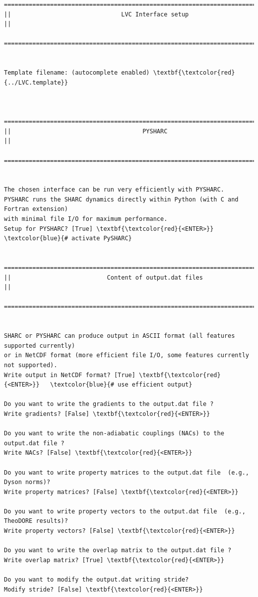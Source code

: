 \documentclass[a4paper,11pt,DIV=15,openany]{scrbook}
\begin{document}
\begin{oframed}
\begin{Verbatim}[commandchars=\\\{\}]
  ================================================================================
||                               LVC Interface setup                              ||
  ================================================================================


Template filename: (autocomplete enabled) \textbf{\textcolor{red}{../LVC.template}}


  ================================================================================
||                                     PYSHARC                                    ||
  ================================================================================


The chosen interface can be run very efficiently with PYSHARC.
PYSHARC runs the SHARC dynamics directly within Python (with C and Fortran extension)
with minimal file I/O for maximum performance.
Setup for PYSHARC? [True] \textbf{\textcolor{red}{<ENTER>}}   \textcolor{blue}{# activate PySHARC}

  ================================================================================
||                           Content of output.dat files                          ||
  ================================================================================


SHARC or PYSHARC can produce output in ASCII format (all features supported currently)
or in NetCDF format (more efficient file I/O, some features currently not supported).
Write output in NetCDF format? [True] \textbf{\textcolor{red}{<ENTER>}}   \textcolor{blue}{# use efficient output}

Do you want to write the gradients to the output.dat file ?
Write gradients? [False] \textbf{\textcolor{red}{<ENTER>}}

Do you want to write the non-adiabatic couplings (NACs) to the output.dat file ?
Write NACs? [False] \textbf{\textcolor{red}{<ENTER>}}

Do you want to write property matrices to the output.dat file  (e.g., Dyson norms)?
Write property matrices? [False] \textbf{\textcolor{red}{<ENTER>}}

Do you want to write property vectors to the output.dat file  (e.g., TheoDORE results)?
Write property vectors? [False] \textbf{\textcolor{red}{<ENTER>}}

Do you want to write the overlap matrix to the output.dat file ?
Write overlap matrix? [True] \textbf{\textcolor{red}{<ENTER>}}

Do you want to modify the output.dat writing stride?
Modify stride? [False] \textbf{\textcolor{red}{<ENTER>}}



\end{Verbatim}
\end{oframed}
\end{document}
